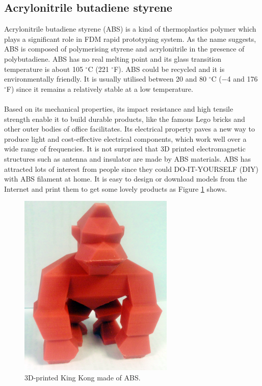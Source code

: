 \subsection{Acrylonitrile butadiene styrene}

Acrylonitrile butadiene styrene (ABS) is a kind of thermoplastics polymer which plays a significant role in FDM rapid prototyping system. As the name suggests, ABS is composed of polymerising styrene and acrylonitrile in the presence of polybutadiene. ABS has no real melting point and its glass transition temperature is about 105 $^{\circ}$C (221 $^{\circ}$F)\cite{rutkowski1986acrylonitrile}.  ABS could be recycled and it is environmentally friendly. It is usually utilised between 20 and 80 $^{\circ}$C (−4 and 176 $^{\circ}$F) since it remains a relatively stable at a low temperature.\\
\\
Based on its mechanical properties, its impact resistance and high tensile strength enable it to build durable products, like the famous Lego bricks and other outer bodies of office facilitates. Its electrical property paves a new way to produce light and cost-effective electrical components, which work well over a wide range of frequencies. It is not surprised that 3D printed electromagnetic structures such as antenna\cite{mirzaee2015developing} and insulator\cite{mehmood2017performance} are made by ABS materials. ABS has attracted lots of interest from people since they could DO-IT-YOURSELF (DIY) with ABS filament at home. It is easy to design or download models from the Internet and print them to get some lovely products as Figure \ref{Fig:ABS product} shows.

\begin{figure}[htbp]
  \centering
  \includegraphics[scale=0.9]{Figs//ABS_product.png}
  \caption[3D-printed King Kong made of ABS]{\footnotesize 3D-printed King Kong made of ABS.}
  \label{Fig:ABS product}
\end{figure}

